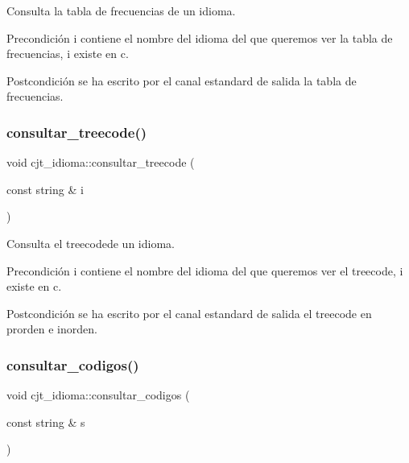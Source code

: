 Consulta la tabla de frecuencias de un idioma. 

\begin{DoxyPrecond}{Precondición}
i contiene el nombre del idioma del que queremos ver la tabla de frecuencias, i existe en c. 
\end{DoxyPrecond}
\begin{DoxyPostcond}{Postcondición}
se ha escrito por el canal estandard de salida la tabla de frecuencias. 
\end{DoxyPostcond}
\mbox{\label{classcjt__idioma_a2d13a4e69a358756359ee6e262de2fb0}} 
\subsubsection{\texorpdfstring{consultar\+\_\+treecode()}{consultar\_treecode()}}
{\footnotesize\ttfamily void cjt\+\_\+idioma\+::consultar\+\_\+treecode (\begin{DoxyParamCaption}\item[{const string \&}]{i }\end{DoxyParamCaption})}



Consulta el treecodede un idioma. 

\begin{DoxyPrecond}{Precondición}
i contiene el nombre del idioma del que queremos ver el treecode, i existe en c. 
\end{DoxyPrecond}
\begin{DoxyPostcond}{Postcondición}
se ha escrito por el canal estandard de salida el treecode en prorden e inorden. 
\end{DoxyPostcond}
\mbox{\label{classcjt__idioma_a2e4b954ce7ee66596412c335430e9be8}} 
\subsubsection{\texorpdfstring{consultar\+\_\+codigos()}{consultar\_codigos()}}
{\footnotesize\ttfamily void cjt\+\_\+idioma\+::consultar\+\_\+codigos (\begin{DoxyParamCaption}\item[{const string \&}]{s }\end{DoxyParamCaption})}



